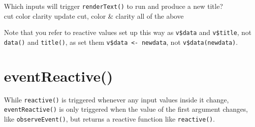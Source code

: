 \documentclass[
  oneside]{book}
\begin{document}
Which inputs will trigger \texttt{renderText}\texttt{()} to run and produce a new title?\\
cut color clarity update cut, color \& clarity all of the above

\begin{warning}
Note that you refer to reactive values set up this way as \texttt{v\$data} and \texttt{v\$title}, not \texttt{data}\texttt{()} and \texttt{title}\texttt{()}, as set them \texttt{v\$data\ \textless{}-\ newdata}, not \texttt{v\$data(newdata)}.

\end{warning}

\hypertarget{eventreactive}{%
\section{eventReactive()}\label{eventreactive}}

While \texttt{reactive}\texttt{()} is triggered whenever any input values inside it change, \texttt{eventReactive}\texttt{()} is only triggered when the value of the first argument changes, like \texttt{observeEvent}\texttt{()}, but returns a reactive function like \texttt{reactive}\texttt{()}.
\end{document}
